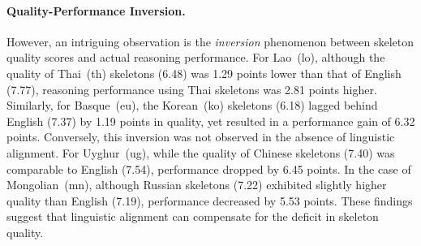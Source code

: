 

\paragraph{Quality-Performance Inversion.} However, an intriguing observation is the \textit{inversion} phenomenon between skeleton quality scores and actual reasoning performance. For Lao~(lo), although the quality of Thai~(th) skeletons (6.48) was 1.29 points lower than that of English (7.77), reasoning performance using Thai skeletons was 2.81 points higher. Similarly, for Basque~(eu), the Korean~(ko) skeletons (6.18) lagged behind English (7.37) by 1.19 points in quality, yet resulted in a performance gain of 6.32 points. Conversely, this inversion was not observed in the absence of linguistic alignment. For Uyghur~(ug), while the quality of Chinese skeletons (7.40) was comparable to English (7.54), performance dropped by 6.45 points. In the case of Mongolian~(mn), although Russian skeletons (7.22) exhibited slightly higher quality than English (7.19), performance decreased by 5.53 points. These findings suggest that linguistic alignment can compensate for the deficit in skeleton quality.

